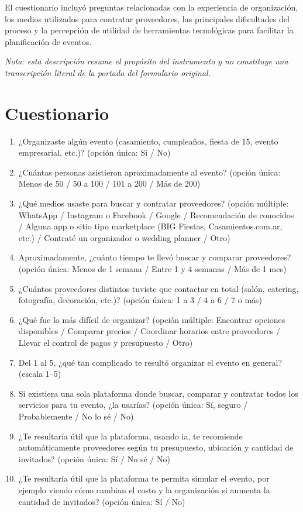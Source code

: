 El cuestionario incluyó preguntas relacionadas con la experiencia de
organización, los medios utilizados para contratar proveedores, las
principales dificultades del proceso y la percepción de utilidad de
herramientas tecnológicas para facilitar la planificación de eventos.

\emph{Nota: esta descripción resume el propósito del instrumento y no
constituye una transcripción literal de la portada del formulario
original.}

\section{Cuestionario}

\begin{enumerate}
    \item ¿Organizaste algún evento (casamiento, cumpleaños, fiesta de
          15, evento empresarial, etc.)? (opción única: Sí / No)
    \item ¿Cuántas personas asistieron aproximadamente al evento? (opción
          única: Menos de 50 / 50 a 100 / 101 a 200 / Más de 200)
    \item ¿Qué medios usaste para buscar y contratar proveedores? (opción
          múltiple: WhatsApp / Instagram o Facebook / Google /
          Recomendación de conocidos / Alguna app o sitio tipo
          marketplace (BIG Fiestas, Casamientos.com.ar, etc.) / Contraté
          un organizador o wedding planner / Otro)
    \item Aproximadamente, ¿cuánto tiempo te llevó buscar y comparar
          proveedores? (opción única: Menos de 1 semana / Entre 1 y 4
          semanas / Más de 1 mes)
    \item ¿Cuántos proveedores distintos tuviste que contactar en total
          (salón, catering, fotografía, decoración, etc.)? (opción
          única: 1 a 3 / 4 a 6 / 7 o más)
    \item ¿Qué fue lo más difícil de organizar? (opción múltiple:
          Encontrar opciones disponibles / Comparar precios / Coordinar
          horarios entre proveedores / Llevar el control de pagos y
          presupuesto / Otro)
    \item Del 1 al 5, ¿qué tan complicado te resultó organizar el evento
          en general? (escala 1--5)
    \item Si existiera una sola plataforma donde buscar, comparar y
          contratar todos los servicios para tu evento, ¿la usarías?
          (opción única: Sí, seguro / Probablemente / No lo sé / No)
    \item ¿Te resultaría útil que la plataforma, usando \gls{ia}, te
          recomiende automáticamente proveedores según tu presupuesto,
          ubicación y cantidad de invitados? (opción única: Sí / No sé /
          No)
    \item ¿Te resultaría útil que la plataforma te permita simular el
          evento, por ejemplo viendo cómo cambian el costo y la
          organización si aumenta la cantidad de invitados? (opción
          única: Sí / No)
\end{enumerate}
